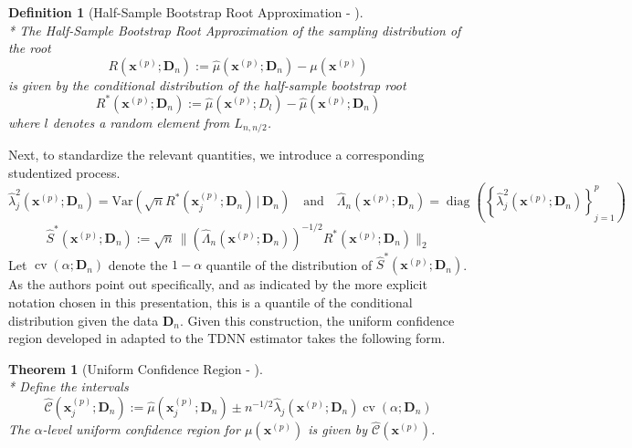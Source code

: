 \documentclass[letterpaper,10pt]{article}
\numberwithin{equation}{section}
\newtheorem{thm}{Theorem}
\numberwithin{thm}{section}
\newtheorem{dfn}{Definition}
\numberwithin{lem}{section}
\numberwithin{cor}{section}
\renewcommand{\hat}{\widehat}
\newcommand{\1}{\mathbbm{1}}
\newcommand{\Var}{\text{Var}}
\begin{document}
\begin{dfn}[Half-Sample Bootstrap Root Approximation - \citet{ritzwoller_uniform_2024}]\mbox{}\\*
	The Half-Sample Bootstrap Root Approximation of the sampling distribution of the root
	\begin{equation}
		R\left(\mathbf{x}^{(p)}; \mathbf{D}_n\right)
		:= \hat{\mu}\left(\mathbf{x}^{(p)}; \mathbf{D}_n\right) - \mu(\mathbf{x}^{(p)})
	\end{equation}
	is given by the conditional distribution of the half-sample bootstrap root
	\begin{equation}
		R^{*}\left(\mathbf{x}^{(p)}; \mathbf{D}_n\right)
		:= \hat{\mu}\left(\mathbf{x}^{(p)}; D_l\right) - \hat{\mu}\left(\mathbf{x}^{(p)}; \mathbf{D}_n\right)
	\end{equation}
	where $l$ denotes a random element from $L_{n, n/2}$.
\end{dfn}
Next, to standardize the relevant quantities, we introduce a corresponding studentized process.
\begin{equation}
	\hat{\lambda}_{j}^{2}\left(\mathbf{x}^{(p)}; \mathbf{D}_n\right) = \Var\left(\sqrt{n} R^{*}(\mathbf{x}^{(p)}_{j}; \mathbf{D}_n) \, | \, \mathbf{D}_n\right)
	\quad \text{and} \quad
	\hat{\Lambda}_n\left(\mathbf{x}^{(p)}; \mathbf{D}_n\right) = \operatorname{diag}\left(\left\{\hat{\lambda}_{j}^{2}\left(\mathbf{x}^{(p)}; \mathbf{D}_n\right)\right\}_{j = 1}^{p}\right)
\end{equation}
\begin{equation}
	\hat{S}^{*}\left(\mathbf{x}^{(p)}; \mathbf{D}_n\right)
	:= \sqrt{n} \, \Big\| \left(\hat{\Lambda}_n\left(\mathbf{x}^{(p)}; \mathbf{D}_n\right)\right)^{-1/2} R^{*}\left(\mathbf{x}^{(p)}; \mathbf{D}_n\right)\Big\|_{2}
\end{equation}
Let $\operatorname{cv}\left(\alpha; \mathbf{D}_n\right)$ denote the $1-\alpha$ quantile of the distribution of $\hat{S}^{*}\left(\mathbf{x}^{(p)}; \mathbf{D}_n\right)$.
As the authors point out specifically, and as indicated by the more explicit notation chosen in this presentation, this is a quantile of the conditional distribution given the data $\mathbf{D}_n$.
Given this construction, the uniform confidence region developed in \citet{ritzwoller_uniform_2024} adapted to the TDNN estimator takes the following form.


\begin{thm}[Uniform Confidence Region - \citet{ritzwoller_uniform_2024}]\mbox{}\\*
	Define the intervals
	\begin{equation}
		\hat{\mathcal{C}}\left(\mathbf{x}^{(p)}_j; \mathbf{D}_n\right)
		:= \hat{\mu}\left(\mathbf{x}^{(p)}_{j}; \mathbf{D}_n\right) \pm
		n^{-1/2} \hat{\lambda}_{j}\left(\mathbf{x}^{(p)}; \mathbf{D}_n\right)\operatorname{cv}\left(\alpha; \mathbf{D}_n\right)
	\end{equation}
	The $\alpha$-level uniform confidence region for $\mu\left(\mathbf{x}^{(p)}\right)$ is given by $\hat{\mathcal{C}}\left(\mathbf{x}^{(p)}\right)$.
\end{thm}
\end{document}
